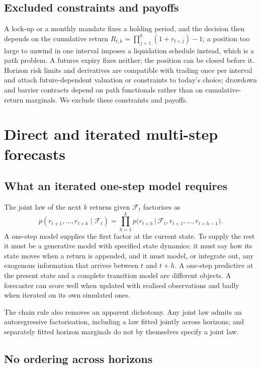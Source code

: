 \documentclass[11pt]{article}
\newcommand{\F}{\mathcal{F}}
\begin{document}
\subsection{Excluded constraints and payoffs}

A lock-up or a monthly mandate fixes a holding period, and the decision then depends on the cumulative return $R_{t,k} = \prod_{j=1}^{k}(1 + r_{t+j}) - 1$; a position too large to unwind in one interval imposes a liquidation schedule instead, which is a path problem. A futures expiry fixes neither; the position can be closed before it. Horizon risk limits and derivatives are compatible with trading once per interval and attach future-dependent valuation or constraints to today's choice; drawdown and barrier contracts depend on path functionals rather than on cumulative-return marginals. We exclude these constraints and payoffs.

\section{Direct and iterated multi-step forecasts}

\subsection{What an iterated one-step model requires}

The joint law of the next $k$ returns given $\F_t$ factorises as
\[
p(r_{t+1}, \dots, r_{t+k} \mid \F_t) = \prod_{h=1}^{k} p\big(r_{t+h} \,\big|\, \F_t, r_{t+1}, \dots, r_{t+h-1}\big).
\]
A one-step model supplies the first factor at the current state. To supply the rest it must be a generative model with specified state dynamics: it must say how its state moves when a return is appended, and it must model, or integrate out, any exogenous information that arrives between $t$ and $t+h$. A one-step predictive at the present state and a complete transition model are different objects. A forecaster can score well when updated with realised observations and badly when iterated on its own simulated ones.

The chain rule also removes an apparent dichotomy. Any joint law admits an autoregressive factorisation, including a law fitted jointly across horizons; and separately fitted horizon marginals do not by themselves specify a joint law.

\subsection{No ordering across horizons}
\end{document}
